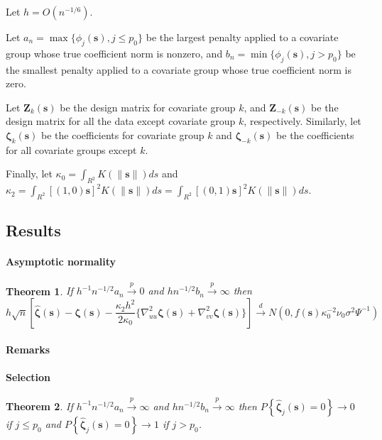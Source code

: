 \documentclass[authoryear, review, 11pt]{elsarticle}
\newtheorem{theorem}{Theorem}[section]
\begin{document}
        Let $h = O(n^{-1/6})$.
        
        Let $a_n = \max \{ \phi_j(\bm{s}), j \le p_0 \}$ be the largest penalty applied to a covariate group whose true coefficient norm is nonzero, and $b_n = \min \{ \phi_j(\bm{s}), j > p_0 \}$ be the smallest penalty applied to a covariate group whose true coefficient norm is zero.
        
        Let $\bm{Z}_k(\bm{s})$ be the design matrix for covariate group $k$, and $\bm{Z}_{-k}(\bm{s})$ be the design matrix for all the data except covariate group $k$, respectively. Similarly, let $\bm{\zeta}_k(\bm{s})$ be the coefficients for covariate group $k$ and $\bm{\zeta}_{-k}(\bm{s})$ be the coefficients for all covariate groups except $k$.

        Finally, let $\kappa_0 = \int_{R^2} K(\|\bm{s}\|) ds$ and $\kappa_2 = \int_{R^2} [(1,0)\bm{s}]^2 K(\|\bm{s}\|) ds = \int_{R^2} [(0,1)\bm{s}]^2 K(\|\bm{s}\|) ds$.

        \subsection{Results}
        \paragraph{Asymptotic normality}
        \begin{theorem} \label{theorem:normality} 
            If $h^{-1} n^{-1/2} a_n \xrightarrow{p} 0$ and $h n^{-1/2} b_n \xrightarrow{p} \infty$ then \[h \sqrt{n} \left[ \hat{\bm{\zeta}}(\bm{s}) - \bm{\zeta}(\bm{s}) - \frac{\kappa_2 h^2}{2 \kappa_0} \{ \nabla_{uu}^2 \bm{\zeta} (\bm{s}) + \nabla_{vv}^2 \bm{\zeta}(\bm{s}) \} \right] \xrightarrow{d} N(0, f(\bm{s}) \kappa_0^{-2} \nu_0 \sigma^2 \Psi^{-1} )\]
        \end{theorem}
  
        \paragraph{Remarks}


        \paragraph{Selection}
        \begin{theorem} \label{theorem:selection}  
            If $h^{-1} n^{-1/2} a_n \xrightarrow{p} \infty$ and $h n^{-1/2} b_n \xrightarrow{p} \infty$ then $P \left\{ \hat{\bm{\zeta}}_j (\bm{s}) = 0 \right\} \to 0$ if $j \le p_0$ and $P \left\{ \hat{\bm{\zeta}}_j (\bm{s}) = 0 \right\} \to 1$ if $j > p_0$.
        \end{theorem}
\end{document}
